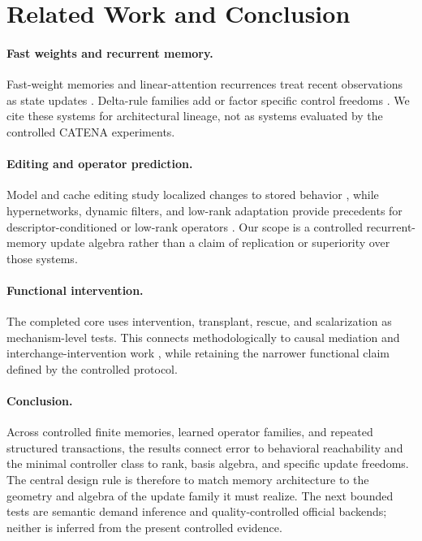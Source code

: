 \section{Related Work and Conclusion}
\label{sec:related}

\paragraph{Fast weights and recurrent memory.}
Fast-weight memories and linear-attention recurrences treat recent
observations as state updates
\citep{schmidhuber1992fastweights,ba2016fastweights,
katharopoulos2020transformersrnn,schlag2021fastweight}.  Delta-rule families
add or factor specific control freedoms
\citep{yang2024deltanet,yang2025gateddeltanet,hatamizadeh2026gdn2,
li2026eda}.  We cite these systems for architectural lineage, not as systems
evaluated by the controlled CATENA experiments.

\paragraph{Editing and operator prediction.}
Model and cache editing study localized changes to stored behavior
\citep{mitchell2022mend,meng2022rome,meng2023memit,li2026kveraser}, while
hypernetworks, dynamic filters, and low-rank adaptation provide precedents for
descriptor-conditioned or low-rank operators
\citep{ha2016hypernetworks,jia2016dynamicfilters,hu2022lora}.  Our scope is a
controlled recurrent-memory update algebra rather than a claim of replication
or superiority over those systems.

\paragraph{Functional intervention.}
The completed core uses intervention, transplant, rescue, and scalarization
as mechanism-level tests.  This connects methodologically to causal mediation
and interchange-intervention work
\citep{pearl2001direct,vig2020causalmediation,
geiger2021causalabstractions}, while retaining the narrower functional claim
defined by the controlled protocol.

\paragraph{Conclusion.}
Across controlled finite memories, learned operator families, and repeated
structured transactions, the results connect error to behavioral
reachability and the minimal controller class to rank, basis algebra, and
specific update freedoms.  The central design rule is therefore to match
memory architecture to the geometry and algebra of the update family it must
realize.  The next bounded tests are semantic demand inference and
quality-controlled official backends; neither is inferred from the present
controlled evidence.
